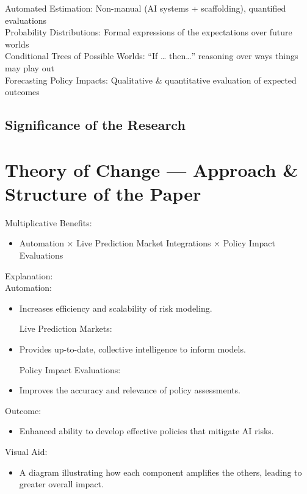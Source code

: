 \documentclass[
  letterpaper,
]{book}
\providecommand{\tightlist}{%
  \setlength{\itemsep}{0pt}\setlength{\parskip}{0pt}}
\begin{document}
Automated Estimation: Non-manual (AI systems + scaffolding), quantified
evaluations\\
Probability Distributions: Formal expressions of the expectations over
future worlds\\
Conditional Trees of Possible Worlds: ``If \ldots{} then\ldots{}''
reasoning over ways things may play out\\
Forecasting Policy Impacts: Qualitative \& quantitative evaluation of
expected outcomes

\subsection{Significance of the
Research}\label{significance-of-the-research}

\section{Theory of Change --- Approach \& Structure of the
Paper}\label{theory-of-change-approach-structure-of-the-paper}

Multiplicative Benefits:

\begin{itemize}
\tightlist
\item
  Automation × Live Prediction Market Integrations × Policy Impact
  Evaluations
\end{itemize}

Explanation:\\
Automation:

\begin{itemize}
\item
  Increases efficiency and scalability of risk modeling.

  Live Prediction Markets:
\item
  Provides up-to-date, collective intelligence to inform models.

  Policy Impact Evaluations:
\item
  Improves the accuracy and relevance of policy assessments.
\end{itemize}

Outcome:

\begin{itemize}
\tightlist
\item
  Enhanced ability to develop effective policies that mitigate AI risks.
\end{itemize}

Visual Aid:

\begin{itemize}
\tightlist
\item
  A diagram illustrating how each component amplifies the others,
  leading to greater overall impact.
\end{itemize}
\end{document}
